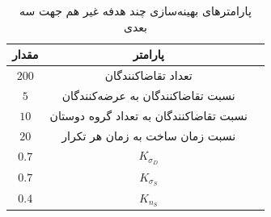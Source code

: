 \begin{table}[H]
	\caption{پارامترهای بهینه‌سازی چند هدفه غیر هم جهت سه بعدی}
	\centering
	\begin{tabular}{|c|c|c|}
		\hline
		مقدار & پارامتر\\
		\hline
		$200$ 
		& تعداد تقاضا‌کنندگان\\
		$5$ 
		& نسبت تقاضاکنندگان به عرضه‌کنندگان \\
		$	10 $
		& نسبت تقاضاکنندگان به تعداد گروه دوستان\\
		$20$ 
		& نسبت زمان ساخت به زمان هر تکرار \\
		$0.7 $ &$K_{\sigma_D}$ \\
		$0.7$ &$K_{\sigma_S}$ \\
		$0.4$ &$K_{n_S}$ \\
		
		\hline
	\end{tabular}
\end{table}
 
 
 
 
 
 
 
 